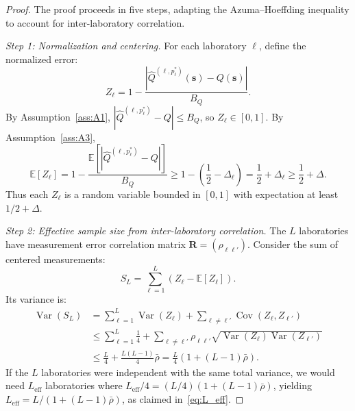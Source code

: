 \documentclass[11pt,a4paper]{article}
\newcommand{\eff}{\mathrm{eff}}
\theoremstyle{definition}
\DeclareMathOperator{\Var}{Var}
\DeclareMathOperator{\Cov}{Cov}
\newcommand{\E}{\mathbb{E}}
\begin{document}
\begin{proof}
The proof proceeds in five steps, adapting the Azuma--Hoeffding
inequality to account for inter-laboratory correlation.

\medskip\noindent\textit{Step 1: Normalization and centering.}
For each laboratory $\ell$, define the normalized error:
\begin{equation}
    Z_\ell = 1 - \frac{|\widehat{Q}^{(\ell, p^*_\ell)}(\mathbf{s}) - Q(\mathbf{s})|}{B_Q}.
\end{equation}
By Assumption~\ref{ass:A1}, $|\widehat{Q}^{(\ell, p^*_\ell)} - Q| \leq B_Q$,
so $Z_\ell \in [0,1]$. By Assumption~\ref{ass:A3},
\begin{equation}
    \E[Z_\ell] = 1 - \frac{\E[|\widehat{Q}^{(\ell, p^*_\ell)} - Q|]}{B_Q}
              \geq 1 - \left(\frac{1}{2} - \Delta_\ell\right)
              = \frac{1}{2} + \Delta_\ell
              \geq \frac{1}{2} + \Delta.
\end{equation}
Thus each $Z_\ell$ is a random variable bounded in $[0,1]$ with
expectation at least $1/2 + \Delta$.

\medskip\noindent\textit{Step 2: Effective sample size from inter-laboratory correlation.}
The $L$ laboratories have measurement error correlation matrix
$\mathbf{R} = (\rho_{\ell\ell'})$. Consider the sum of centered
measurements:
\begin{equation}
    S_L = \sum_{\ell=1}^{L} (Z_\ell - \E[Z_\ell]).
\end{equation}
Its variance is:
\begin{align}
    \Var(S_L) &= \sum_{\ell=1}^{L} \Var(Z_\ell) + \sum_{\ell \neq \ell'} \Cov(Z_\ell, Z_{\ell'}) \\
              &\leq \sum_{\ell=1}^{L} \frac{1}{4} + \sum_{\ell \neq \ell'} \rho_{\ell\ell'} \sqrt{\Var(Z_\ell) \Var(Z_{\ell'})} \\
              &\leq \frac{L}{4} + \frac{L(L-1)}{4} \bar{\rho}
               = \frac{L}{4}(1 + (L-1)\bar{\rho}).
\end{align}
If the $L$ laboratories were independent with the same total variance,
we would need $L_{\eff}$ laboratories where $L_{\eff}/4 = (L/4)(1 + (L-1)\bar{\rho})$,
yielding $L_{\eff} = L / (1 + (L-1)\bar{\rho})$, as claimed in~\eqref{eq:L_eff}.


\end{proof}
\end{document}
